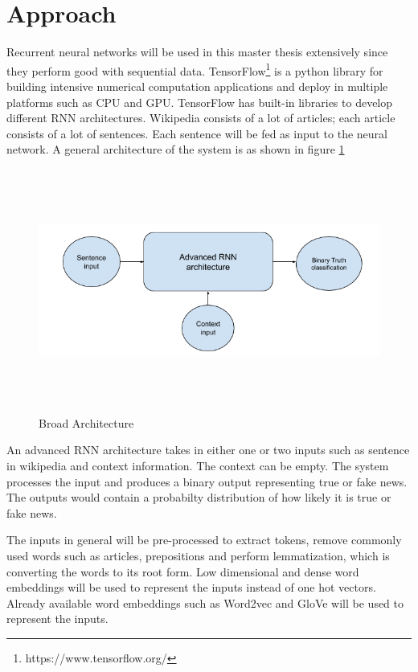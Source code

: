\documentclass[a4paper, 11pt]{article}
\begin{document}
\section{Approach}  
Recurrent neural networks will be used in this master thesis extensively since they perform good with sequential data. TensorFlow\footnote{https://www.tensorflow.org/} is a python library for building intensive numerical computation applications and deploy in multiple platforms such as CPU and GPU. TensorFlow has built-in libraries to develop different RNN architectures. Wikipedia consists of a lot of articles; each article consists of a lot of sentences. Each sentence will be fed as input to the neural network. A general architecture of the system is as shown in figure \ref{fig:broad_architecture}

\begin{figure}[htpb]
    \centering
    \includegraphics[width=\textwidth,height=8cm,keepaspectratio=true]
    {broad-architecture-diagram.png}
    \caption{
        Broad Architecture
    }
    \label{fig:broad_architecture}
\end{figure}

An advanced RNN architecture takes in either one or two inputs such as sentence in wikipedia and context information. The context can be empty. The system processes the input and produces a binary output representing true or fake news. The outputs would contain a probabilty distribution of how likely it is true or fake news.

The inputs in general will be pre-processed to extract tokens, remove commonly used words such as articles, prepositions and perform lemmatization, which is converting the words to its root form. Low dimensional and dense word embeddings will be used to represent the inputs instead of one hot vectors. Already available word embeddings such as Word2vec and GloVe will be used to represent the inputs.
\end{document}
